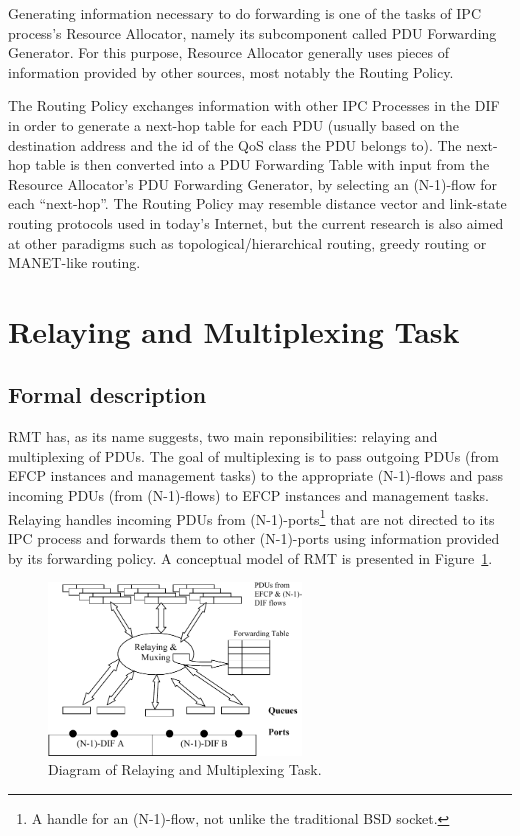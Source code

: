         Generating information necessary to do forwarding is one of the tasks of IPC process's Resource Allocator, namely its subcomponent called PDU Forwarding Generator. For this purpose, Resource Allocator generally uses pieces of information provided by other sources, most notably the Routing Policy.

        The Routing Policy exchanges information with other IPC Processes in the DIF in order to generate a next-hop table for each PDU (usually based on the destination address and the id of the QoS class the PDU belongs to). The next-hop table is then converted into a PDU Forwarding Table with input from the Resource Allocator's PDU Forwarding Generator, by selecting an (N-1)-flow for each ``next-hop''. The Routing Policy may resemble distance vector and link-state routing protocols used in today's Internet, but the current research is also aimed at other paradigms such as topological/hierarchical routing, greedy routing or MANET-like routing.


    \section{Relaying and Multiplexing Task}

        \subsection{Formal description}

            RMT has, as its name suggests, two main reponsibilities: relaying and multiplexing of PDUs. The goal of multiplexing is to pass outgoing PDUs (from EFCP instances and management tasks) to the appropriate (N-1)-flows and pass incoming PDUs (from (N-1)-flows) to EFCP instances and management tasks. Relaying handles incoming PDUs from (N-1)-ports\footnote{A handle for an (N-1)-flow, not unlike the traditional BSD socket.} that are not directed to its IPC process and forwards them to other (N-1)-ports using information provided by its forwarding policy. A conceptual model of RMT is presented in Figure~\ref{fig:rina:rmt:model}.

            \begin{figure}[H]
                \begin{center}
                    \includegraphics[width=0.6\textwidth]{fig/fwding_rmt-module.pdf}
                  \caption{Diagram of Relaying and Multiplexing Task.}
                  \label{fig:rina:rmt:model}
                \end{center}
            \end{figure}

